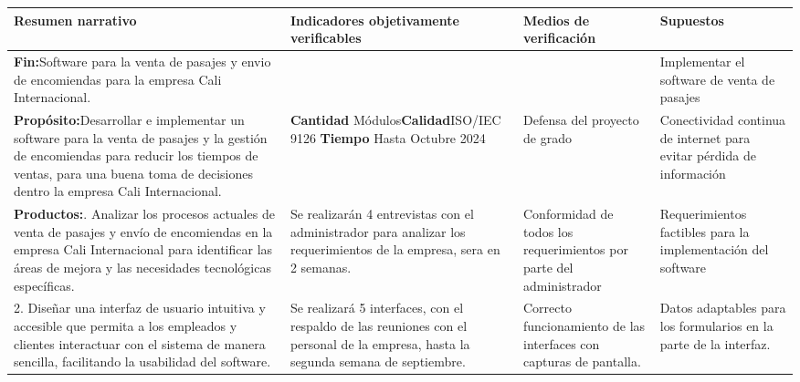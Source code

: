 \documentclass[12pt,letterpaper]{article}
\begin{document}
\begin{spacing}{1.1}
	\footnotesize
	\setlength{\LTpost}{0pt}
	
	\begin{longtable}{| m{5.3cm} | m{2.9cm} | m{3.4cm} | m{3.4cm} | } %
		\hline
		\textbf{Resumen narrativo} & \textbf{Indicadores objetivamente verificables}  & \textbf{Medios de verificación} & \textbf{Supuestos} \\ 
		\hline  
		\textbf{Fin:}\newline Software para la venta de pasajes y envio de encomiendas para la empresa Cali Internacional. & & & Implementar el software de venta de pasajes \\
		\hline 
		
		\textbf{Propósito:}\newline Desarrollar e implementar un software para la venta de pasajes y la gestión de encomiendas para reducir los tiempos de ventas, para una buena toma de decisiones dentro la empresa Cali Internacional. & \textbf{Cantidad}\newline 5 Módulos\newline \textbf{Calidad}\newline ISO/IEC 9126 \newline \textbf{Tiempo} \newline Hasta Octubre 2024 & Defensa del proyecto de grado & Conectividad continua de internet para evitar pérdida de información \\
		\hline
		
		\textbf{Productos:}\newline		
		1. Analizar los procesos actuales de venta de pasajes y envío de encomiendas en la empresa Cali Internacional para identificar las áreas de mejora y las necesidades tecnológicas específicas. &  Se realizarán 4 entrevistas con el administrador para analizar los requerimientos de la empresa, sera en 2 semanas. & Conformidad de todos los requerimientos por parte del administrador & Requerimientos factibles
		para la implementación del software \\
		\hline
		
		2. Diseñar una interfaz de usuario intuitiva y accesible que permita a los empleados y clientes interactuar con el sistema de manera sencilla, facilitando la usabilidad del software. &  Se realizará 5 interfaces, con el respaldo de las reuniones con el personal de la empresa, hasta la
		segunda semana de septiembre. & Correcto funcionamiento de las interfaces con capturas de pantalla. & Datos adaptables para los formularios en la parte de la interfaz. \\
		\hline
		

\end{longtable}
\end{spacing}
\end{document}
